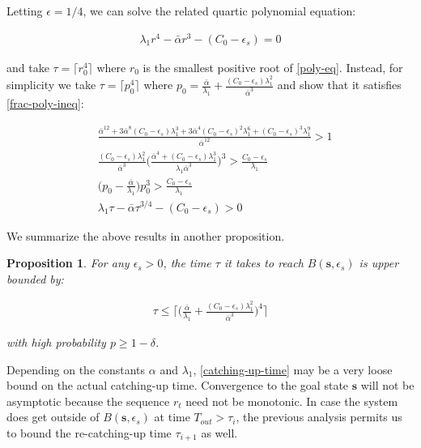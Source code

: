 \documentclass[10pt,a4paper]{article}
\newcommand{\traj}{\mathbf{s}} %
\newtheorem{prop}{Proposition}[section]
\begin{document}
Letting $\epsilon = 1/4$, we can solve the related quartic polynomial equation:

\begin{align}
\lambda_1 r^4 - \bar{\alpha} r^3 - (C_{0} - \epsilon_s) = 0 \label{poly-eq}
\end{align}

and take $\tau = \lceil r_0^4 \rceil$ where $r_0$ is the smallest positive root of \eqref{poly-eq}. Instead, for simplicity we take $\tau = \lceil p_0^4 \rceil$ where $p_0 = \frac{\bar{\alpha}}{\lambda_1} + \frac{(C_0 - \epsilon_s)\lambda_1^2}{\bar{\alpha}^3}$ and show that it satisfies \eqref{frac-poly-ineq}:

\begin{align*}
&\frac{\bar{\alpha}^{12} + 3\bar{\alpha}^8(C_0 - \epsilon_s)\lambda_1^3 + 3\bar{\alpha}^4(C_0 - \epsilon_s)^2\lambda_1^6 + (C_0 - \epsilon_s)^3\lambda_1^9}{\bar{\alpha}^{12}} > 1 \\
&\frac{(C_0 - \epsilon_s)\lambda_1^2}{\bar{\alpha}^3}\Big(\frac{\bar{\alpha}^4 + (C_0 - \epsilon_s)\lambda_1^3}{\lambda_1 \bar{\alpha}^3}\Big)^3 > \frac{C_0 - \epsilon_s}{\lambda_1} \\
& \Big(p_0 - \frac{\bar{\alpha}}{\lambda_1}\Big)p_0^{3} > \frac{C_0 - \epsilon_s}{\lambda_1} \\
&\lambda_1 \tau - \bar{\alpha} \tau^{3/4} - (C_{0}-\epsilon_s) > 0
\end{align*}

We summarize the above results in another proposition. 

\begin{prop}\label{point-tracking-conv}
For any $\epsilon_s > 0$, the time $\tau$ it takes to reach $B(\traj,\epsilon_s)$ is upper bounded by:

\begin{align}
\tau \leq \lceil \big(\frac{\bar{\alpha}}{\lambda_1} + \frac{(C_0 - \epsilon_s)\lambda_1^2}{\bar{\alpha}^3}\big)^4 \rceil
\label{catching-up-time}
\end{align}

with high probability $p \geq 1 - \delta$. 
\end{prop}

Depending on the constants $\alpha$ and $\lambda_1$, \eqref{catching-up-time} may be a very loose bound on the actual catching-up time. Convergence to the goal state $\traj$ will not be asymptotic because the sequence $r_t$ need not be monotonic. In case the system does get outside of $B(\traj, \epsilon_s)$ at time $T_{out} > \tau_i$, the previous analysis permits us to bound the re-catching-up time $\tau_{i+1}$ as well.
\end{document}
